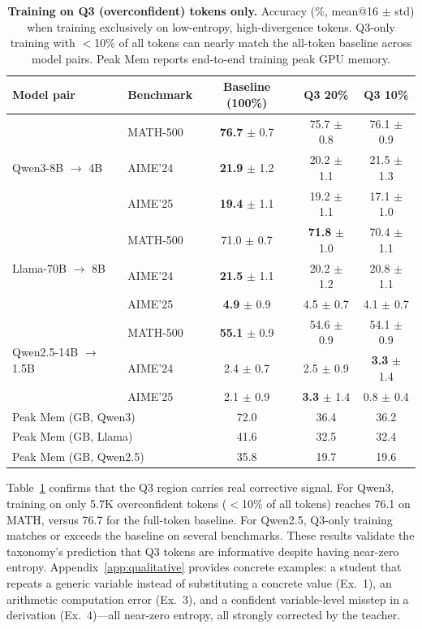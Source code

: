 \documentclass{article}
\begin{document}
\begin{table}[t]
\centering
\caption{\textbf{Training on Q3 (overconfident) tokens only.} Accuracy (\%, mean@16 $\pm$ std) when training exclusively on low-entropy, high-divergence tokens. Q3-only training with $<$10\% of all tokens can nearly match the all-token baseline across model pairs. Peak Mem reports end-to-end training peak GPU memory.}
\label{tab:q3_only}
\small
\begin{tabular}{l l ccc}
\toprule
Model pair & Benchmark & Baseline (100\%) & Q3 20\% & Q3 10\% \\
\midrule
\multirow{3}{*}{Qwen3-8B $\to$ 4B}
 & MATH-500 & \textbf{76.7} $\pm$ 0.7 & 75.7 $\pm$ 0.8 & 76.1 $\pm$ 0.9 \\
 & AIME'24 & \textbf{21.9} $\pm$ 1.2 & 20.2 $\pm$ 1.1 & 21.5 $\pm$ 1.3 \\
 & AIME'25 & \textbf{19.4} $\pm$ 1.1 & 19.2 $\pm$ 1.1 & 17.1 $\pm$ 1.0 \\
\midrule
\multirow{3}{*}{Llama-70B $\to$ 8B}
 & MATH-500 & 71.0 $\pm$ 0.7 & \textbf{71.8} $\pm$ 1.0 & 70.4 $\pm$ 1.1 \\
 & AIME'24 & \textbf{21.5} $\pm$ 1.1 & 20.2 $\pm$ 1.2 & 20.8 $\pm$ 1.1 \\
 & AIME'25 & \textbf{4.9} $\pm$ 0.9 & 4.5 $\pm$ 0.7 & 4.1 $\pm$ 0.7 \\
\midrule
\multirow{3}{*}{Qwen2.5-14B $\to$ 1.5B}
 & MATH-500 & \textbf{55.1} $\pm$ 0.9 & 54.6 $\pm$ 0.9 & 54.1 $\pm$ 0.9 \\
 & AIME'24 & 2.4 $\pm$ 0.7 & 2.5 $\pm$ 0.9 & \textbf{3.3} $\pm$ 1.4 \\
 & AIME'25 & 2.1 $\pm$ 0.9 & \textbf{3.3} $\pm$ 1.4 & 0.8 $\pm$ 0.4 \\
\midrule
\multicolumn{2}{l}{Peak Mem (GB, Qwen3)} & 72.0 & 36.4 & 36.2 \\
\multicolumn{2}{l}{Peak Mem (GB, Llama)} & 41.6 & 32.5 & 32.4 \\
\multicolumn{2}{l}{Peak Mem (GB, Qwen2.5)} & 35.8 & 19.7 & 19.6 \\
\bottomrule
\end{tabular}
\end{table}

Table~\ref{tab:q3_only} confirms that the Q3 region carries real corrective signal.
For Qwen3, training on only 5.7K overconfident tokens ($<$10\% of all tokens) reaches 76.1 on MATH, versus 76.7 for the full-token baseline.
For Qwen2.5, Q3-only training matches or exceeds the baseline on several benchmarks.
These results validate the taxonomy's prediction that Q3 tokens are informative despite having near-zero entropy.
Appendix~\ref{app:qualitative} provides concrete examples: a student that repeats a generic variable instead of substituting a concrete value (Ex.~1), an arithmetic computation error (Ex.~3), and a confident variable-level misstep in a derivation (Ex.~4)---all near-zero entropy, all strongly corrected by the teacher.
\end{document}
